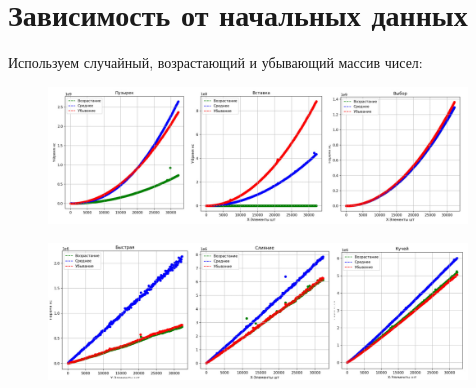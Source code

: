\documentclass[a4paper,12pt]{article} %
\begin{document}
\section{Зависимость от начальных данных}
Используем случайный, возрастающий и убывающий массив чисел:
\begin{figure}[H]
    \centering
    \includegraphics[width=0.99\textwidth]{tr1.jpg}
\end{figure} 
\begin{figure}[H]
    \centering
    \includegraphics[width=0.99\textwidth]{tr2.jpg}
\end{figure} 
\end{document}
